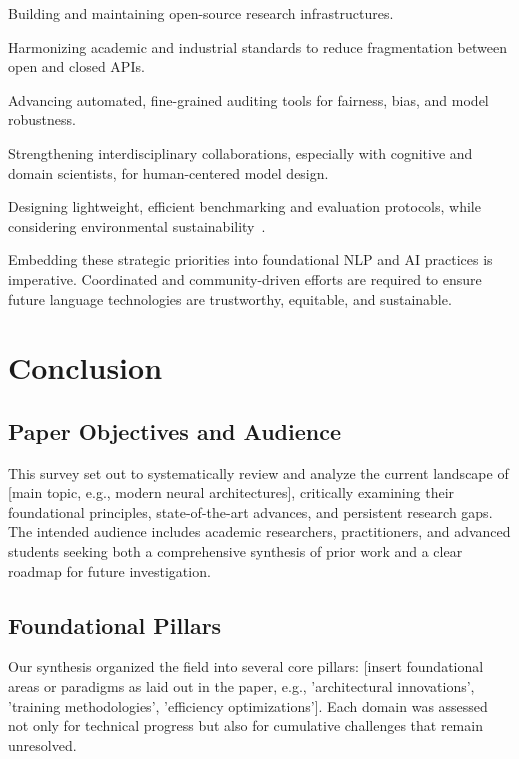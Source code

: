 \documentclass[sigconf]{acmart}
\begin{document}
Building and maintaining open-source research infrastructures.

Harmonizing academic and industrial standards to reduce fragmentation between open and closed APIs.

Advancing automated, fine-grained auditing tools for fairness, bias, and model robustness.

Strengthening interdisciplinary collaborations, especially with cognitive and domain scientists, for human-centered model design.

Designing lightweight, efficient benchmarking and evaluation protocols, while considering environmental sustainability~\cite{ref13,ref34,ref46,ref47,ref55,ref66,ref68,ref70,ref71,ref88,ref101,ref104,ref106,ref107,ref108}.

Embedding these strategic priorities into foundational NLP and AI practices is imperative. Coordinated and community-driven efforts are required to ensure future language technologies are trustworthy, equitable, and sustainable.

\section{Conclusion}

\subsection{Paper Objectives and Audience}

This survey set out to systematically review and analyze the current landscape of [main topic, e.g., modern neural architectures], critically examining their foundational principles, state-of-the-art advances, and persistent research gaps. The intended audience includes academic researchers, practitioners, and advanced students seeking both a comprehensive synthesis of prior work and a clear roadmap for future investigation.

\subsection{Foundational Pillars}

Our synthesis organized the field into several core pillars: [insert foundational areas or paradigms as laid out in the paper, e.g., 'architectural innovations', 'training methodologies', 'efficiency optimizations']. Each domain was assessed not only for technical progress but also for cumulative challenges that remain unresolved.
\end{document}
